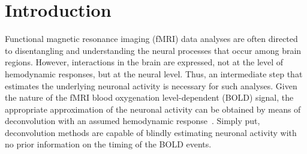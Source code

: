 \section{Introduction}








Functional magnetic resonance imaging (fMRI) data analyses are often directed to disentangling and understanding the neural processes that occur among brain regions. However, interactions in the brain are expressed, not at the level of hemodynamic responses, but at the neural level. Thus, an intermediate step that estimates the underlying neuronal activity is necessary for such analyses. Given the nature of the fMRI blood oxygenation level-dependent (BOLD) signal, the appropriate approximation of the neuronal activity can be obtained by means of deconvolution with an assumed hemodynamic response~\cite{gitelman2003ModelingRegionalPsychophysiologic}. Simply put, deconvolution methods are capable of blindly estimating neuronal activity with no prior information on the timing of the BOLD events.

